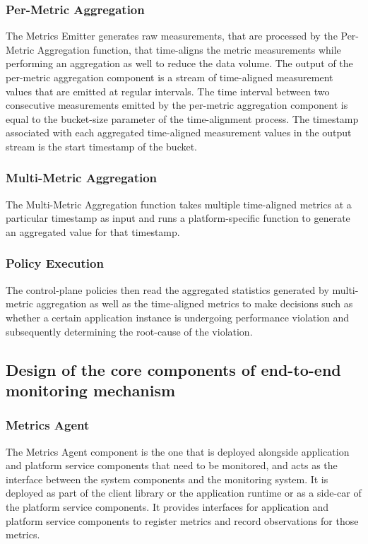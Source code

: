 \subsubsection{Per-Metric Aggregation}
The Metrics Emitter generates raw measurements, that are processed by the Per-Metric Aggregation function, that time-aligns the metric measurements while performing an aggregation as well to reduce the data volume. The output of the per-metric aggregation component is a stream of time-aligned measurement values that are emitted at regular intervals. The time interval between two consecutive measurements emitted by the per-metric aggregation component is equal to the bucket-size parameter of the time-alignment process. The timestamp associated with each aggregated time-aligned measurement values in the output stream is the start timestamp of the bucket.

\subsubsection{Multi-Metric Aggregation}
The Multi-Metric Aggregation function takes multiple time-aligned metrics at a particular timestamp as input and runs a platform-specific function to generate an aggregated value for that timestamp. 

\subsubsection{Policy Execution}
The control-plane policies then read the aggregated statistics generated by multi-metric aggregation as well as the time-aligned metrics to make decisions such as whether a certain application instance is undergoing performance violation and subsequently determining the root-cause of the violation.

\subsection{Design of the core components of end-to-end monitoring mechanism}
\subsubsection{Metrics Agent}
The Metrics Agent component is the one that is deployed alongside application and platform service components that need to be monitored, and acts as the interface between the system components and the monitoring system. It is deployed as part of the client library or the application runtime or as a side-car of the platform service components. It provides interfaces for application and platform service components to register metrics and record observations for those metrics. 

